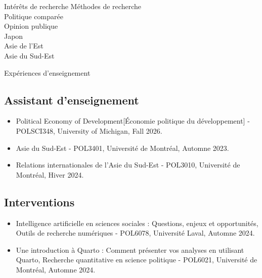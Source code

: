 \documentclass{resume} %
\begin{document}
\begin{rSection}{Intérêts de recherche}
	Méthodes de recherche
	\\ Politique comparée
	\\ Opinion publique
	\\ Japon
	\\ Asie de l'Est
	\\ Asie du Sud-Est
\end{rSection}


\begin{rSection}{Expériences d'enseignement}
	\subsection*{Assistant d'enseignement}
	\begin{itemize}
		\item[-] Political Economy of Development[Économie politique du développement] - POLSCI348, University of Michigan, Fall 2026.
		\item[-] Asie du Sud-Est - POL3401, Université de Montréal, Automne 2023.
		\item[-] Relations internationales de l'Asie du Sud-Est - POL3010, Université de Montréal, Hiver 2024.
	\end{itemize}
	\subsection*{Interventions}
	\begin{itemize}
		\item[-] Intelligence artificielle en sciences sociales : Questions, enjeux et opportunités, Outils de recherche numériques - POL6078, Université Laval, Automne 2024.
		\item[-] Une introduction à Quarto : Comment présenter vos analyses en utilisant Quarto, Recherche quantitative en science politique - POL6021, Université de Montréal, Automne 2024.
	\end{itemize}

\end{rSection}
\end{document}
